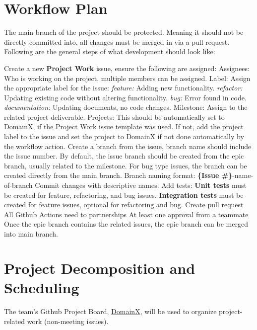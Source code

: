 \documentclass{article}
\begin{document}
\section{Workflow Plan}
The main branch of the project should be protected. Meaning it should not be directly committed into, all changes must be merged in via a pull request.
Following are the general steps of what development should look like:
\begin{outline}[itemize]
 \1 Create a new \textbf{Project Work} issue, ensure the following are assigned:
  \2 Assignees: Who is working on the project, multiple members can be assigned.
  \2 Label: Assign the appropriate label for the issue:
    \3 \textit{feature:} Adding new functionality.
    \3 \textit{refactor:} Updating existing code without altering functionality.
    \3 \textit{bug:} Error found in code.
    \3 \textit{documentation:} Updating documents, no code changes.
  \2 Milestone: Assign to the related project deliverable.
  \2 Projects: This should be automatically set to DomainX, if the Project Work issue template was used.
    \3 If not, add the project label to the issue and set the project to DomainX if not done automatically by the workflow action.
\1 Create a branch from the issue, branch name should include the issue number. 
  \2 By default, the issue branch should be created from the epic branch, usually related to the milestone.
  \2 For bug type issues, the branch can be created directly from the main branch.
  \2 Branch naming format: \textbf{\{Issue \#\}}-name-of-branch
\1 Commit changes with descriptive names.
\1 Add tests:
  \2 \textbf{Unit tests} must be created for feature, refactoring, and bug issues.
  \2 \textbf{Integration tests} must be created for feature issues, optional for refactoring and bug.
\1 Create pull request
  \2 All Github Actions need to partnerships
  \2 At least one approval from a teammate
\1 Once the epic branch contains the related issues, the epic branch can be merged into main branch.
\end{outline}

\section{Project Decomposition and Scheduling}

The team's Github Project Board, \href{https://github.com/users/thaafei/projects/6}{DomainX}, will be used to organize project-related work (non-meeting issues). 

\end{document}
